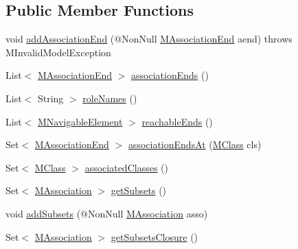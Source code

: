 \subsection*{Public Member Functions}
\begin{DoxyCompactItemize}
\item 
void \hyperlink{interfaceorg_1_1tzi_1_1use_1_1uml_1_1mm_1_1_m_association_a95536766cc7a3d62777eb025263952a8}{add\-Association\-End} (@Non\-Null \hyperlink{classorg_1_1tzi_1_1use_1_1uml_1_1mm_1_1_m_association_end}{M\-Association\-End} aend)  throws M\-Invalid\-Model\-Exception
\item 
List$<$ \hyperlink{classorg_1_1tzi_1_1use_1_1uml_1_1mm_1_1_m_association_end}{M\-Association\-End} $>$ \hyperlink{interfaceorg_1_1tzi_1_1use_1_1uml_1_1mm_1_1_m_association_a0c5dcb50a19f1abce1c82c45df0808a5}{association\-Ends} ()
\item 
List$<$ String $>$ \hyperlink{interfaceorg_1_1tzi_1_1use_1_1uml_1_1mm_1_1_m_association_ae1f89bbf2750c1846908238f57a29c0f}{role\-Names} ()
\item 
List$<$ \hyperlink{interfaceorg_1_1tzi_1_1use_1_1uml_1_1mm_1_1_m_navigable_element}{M\-Navigable\-Element} $>$ \hyperlink{interfaceorg_1_1tzi_1_1use_1_1uml_1_1mm_1_1_m_association_aaf2c335364b1b0efee3912f2779f0f9e}{reachable\-Ends} ()
\item 
Set$<$ \hyperlink{classorg_1_1tzi_1_1use_1_1uml_1_1mm_1_1_m_association_end}{M\-Association\-End} $>$ \hyperlink{interfaceorg_1_1tzi_1_1use_1_1uml_1_1mm_1_1_m_association_a6fc0c2936a4c57d0d67d0aa109b054fc}{association\-Ends\-At} (\hyperlink{interfaceorg_1_1tzi_1_1use_1_1uml_1_1mm_1_1_m_class}{M\-Class} cls)
\item 
Set$<$ \hyperlink{interfaceorg_1_1tzi_1_1use_1_1uml_1_1mm_1_1_m_class}{M\-Class} $>$ \hyperlink{interfaceorg_1_1tzi_1_1use_1_1uml_1_1mm_1_1_m_association_a2aa66abab6629f674bc8e968779b1aca}{associated\-Classes} ()
\item 
Set$<$ \hyperlink{interfaceorg_1_1tzi_1_1use_1_1uml_1_1mm_1_1_m_association}{M\-Association} $>$ \hyperlink{interfaceorg_1_1tzi_1_1use_1_1uml_1_1mm_1_1_m_association_a707f785a96690b259557e2060eceb80c}{get\-Subsets} ()
\item 
void \hyperlink{interfaceorg_1_1tzi_1_1use_1_1uml_1_1mm_1_1_m_association_a17d6eaaf12200d164a1cb6ba8c5cda75}{add\-Subsets} (@Non\-Null \hyperlink{interfaceorg_1_1tzi_1_1use_1_1uml_1_1mm_1_1_m_association}{M\-Association} asso)
\item 
Set$<$ \hyperlink{interfaceorg_1_1tzi_1_1use_1_1uml_1_1mm_1_1_m_association}{M\-Association} $>$ \hyperlink{interfaceorg_1_1tzi_1_1use_1_1uml_1_1mm_1_1_m_association_a687ac24463159a6cbfc548e8a1a4b406}{get\-Subsets\-Closure} ()

\end{DoxyCompactItemize}
